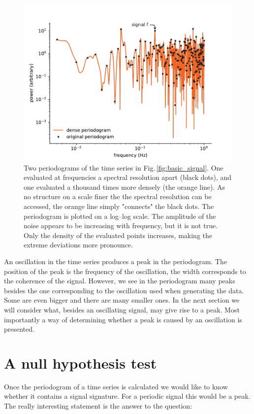 \begin{figure}
  \centering \includegraphics[width=0.8\linewidth]{gfx/axions/basic_periodogram_loglog.pdf}
  \caption{Two periodograms of the time series in Fig.\,\ref{fig:basic_signal}. One evaluated at frequencies a spectral resolution apart (black dots), and one evaluated a thousand times more densely (the orange line). As no structure on a scale finer the the spectral resolution can be accessed, the orange line simply "connects" the black dots. The periodogram is plotted on a log--log scale. The amplitude of the noise appears to be increasing with frequency, but it is not true. Only the density of the evaluated points increases, making the extreme deviations more pronounce.}
  \label{fig:basic_periodogram_loglog}
\end{figure}

An oscillation in the time series produces a peak in the periodogram. The position of the peak is the frequency of the oscillation, the width corresponds to the coherence of the signal. However, we see in the periodogram many peaks besides the one corresponding to the oscillation used when generating the data. Some are even bigger and there are many smaller ones. In the next section we will consider what, besides an oscillating signal, may give rise to a peak. Most importantly a way of determining whether a peak is caused by an oscillation is presented.




\section{A null hypothesis test}

Once the periodogram of a time series is calculated we would like to know whether it contains a signal signature. For a periodic signal this would be a peak. The really interesting statement is the answer to the question:

